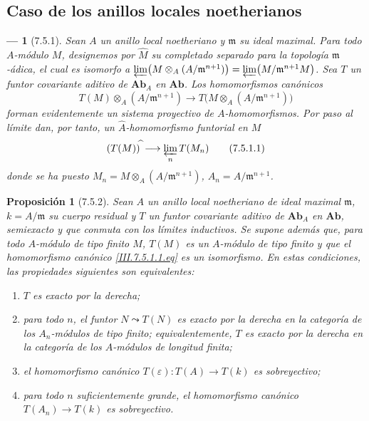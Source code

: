 \documentclass[10pt,oneside,openany]{book}
\theoremstyle{egaenv}\newtheorem*{env}{---}
\theoremstyle{egastatement}
\newtheorem*{proposition}{Proposición}
\theoremstyle{egadescription}
\newcommand{\oldpage}[2][]{\marginnote{\normalfont\scriptsize\textbf{#1}\,|\,#2}\ignorespaces}
\begin{document}
\oldpage[III]{190}
\subsection{Caso de los anillos locales noetherianos}
\label{subsection:III.7.5}
\label{subsection:III.7.5.fr}

\begin{env}[7.5.1]
\label{III.7.5.1}
Sean $A$ un anillo local noetheriano y $\mathfrak m$ su ideal
maximal. Para todo $A$-módulo $M$, designemos por $\widehat M$ su
completado separado para la topología $\mathfrak m$-ádica, el cual es
isomorfo a
$\varprojlim\bigl(M\otimes_A(A/\mathfrak m^{n+1})\bigr)=\varprojlim\bigl(M/\mathfrak m^{n+1}M\bigr)$.
Sea $T$ un funtor covariante aditivo de $\boldsymbol{Ab}_A$ en
$\boldsymbol{Ab}$. Los homomorfismos canónicos
\[
  T(M)\otimes_A(A/\mathfrak m^{n+1})
  \longrightarrow
  T\bigl(M\otimes_A(A/\mathfrak m^{n+1})\bigr)
\]
forman evidentemente un sistema proyectivo de $A$-homomorfismos. Por
paso al límite dan, por tanto, un $\widehat A$-homomorfismo funtorial
en $M$
\[
  (T(M))^{\widehat{\,}}
  \longrightarrow
  \varprojlim_n T(M_n)
  \tag{7.5.1.1}\label{III.7.5.1.1.fr}
\]
donde se ha puesto
$M_n=M\otimes_A(A/\mathfrak m^{n+1})$, $A_n=A/\mathfrak m^{n+1}$.
\end{env}

\begin{proposition}[7.5.2]
\label{III.7.5.2}
Sean $A$ un anillo local noetheriano de ideal maximal $\mathfrak m$,
$k=A/\mathfrak m$ su cuerpo residual y $T$ un funtor covariante
aditivo de $\mathbf{Ab}_A$ en $\mathbf{Ab}$, semiexacto y que conmuta con
los límites inductivos. Se supone además que, para todo $A$-módulo
de tipo finito $M$, $T(M)$ es un $A$-módulo de tipo finito y que el
homomorfismo canónico \eqref{III.7.5.1.1.eq} es un isomorfismo. En
estas condiciones, las propiedades siguientes son equivalentes:
\begin{enumerate}
  \item[(a)] $T$ es exacto por la derecha;
  \item[(b)] para todo $n$, el funtor $N\leadsto T(N)$ es exacto por
    la derecha en la categoría de los $A_n$-módulos de tipo finito;
    equivalentemente, $T$ es exacto por la derecha en la categoría
    de los $A$-módulos \emph{de longitud finita};
  \item[(c)] el homomorfismo canónico
    $T(\varepsilon):T(A)\longrightarrow T(k)$
    es sobreyectivo;
  \item[(d)] para todo $n$ suficientemente grande, el homomorfismo
    canónico
    $T(A_n)\longrightarrow T(k)$ es sobreyectivo.
\end{enumerate}
\end{proposition}
\end{document}
